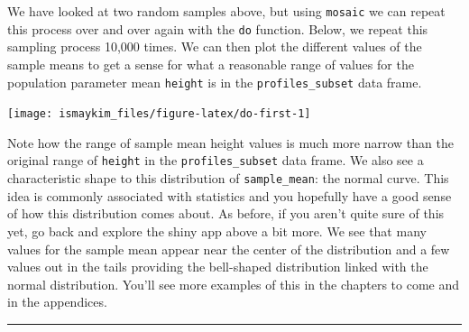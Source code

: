 \documentclass[]{tufte-book}
\newenvironment{Shaded}{\begin{snugshade}}{\end{snugshade}}
\newcommand{\KeywordTok}[1]{\textcolor[rgb]{0.13,0.29,0.53}{\textbf{{#1}}}}
\newcommand{\DataTypeTok}[1]{\textcolor[rgb]{0.13,0.29,0.53}{{#1}}}
\newcommand{\DecValTok}[1]{\textcolor[rgb]{0.00,0.00,0.81}{{#1}}}
\newcommand{\StringTok}[1]{\textcolor[rgb]{0.31,0.60,0.02}{{#1}}}
\newcommand{\OtherTok}[1]{\textcolor[rgb]{0.56,0.35,0.01}{{#1}}}
\newcommand{\NormalTok}[1]{{#1}}
\let\oldrule=\rule
\renewcommand{\rule}[1]{\oldrule{\linewidth}}
\begin{document}
We have looked at two random samples above, but using \texttt{mosaic} we
can repeat this process over and over again with the \texttt{do}
function. Below, we repeat this sampling process 10,000 times. We can
then plot the different values of the sample means to get a sense for
what a reasonable range of values for the population parameter mean
\texttt{height} is in the \texttt{profiles\_subset} data frame.

\begin{Shaded}
\end{Shaded}

\begin{center}\texttt{[image: ismaykim\_files/figure-latex/do-first-1]} \end{center}

Note how the range of sample mean height values is much more narrow than
the original range of \texttt{height} in the \texttt{profiles\_subset}
data frame. We also see a characteristic shape to this distribution of
\texttt{sample\_mean}: the normal curve. This idea is commonly
associated with statistics and you hopefully have a good sense of how
this distribution comes about. As before, if you aren't quite sure of
this yet, go back and explore the shiny app above a bit more. We see
that many values for the sample mean appear near the center of the
distribution and a few values out in the tails providing the bell-shaped
distribution linked with the normal distribution. You'll see more
examples of this in the chapters to come and in the appendices.

\begin{center}\rule{0.5\linewidth}{\linethickness}\end{center}
\end{document}
